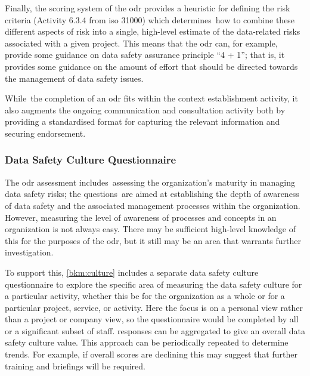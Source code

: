 Finally, the scoring system of the \gls{odr} provides a heuristic for defining the risk criteria
(Activity 6.3.4 \cbstart from \acrshort{iso} 31000\cbend)
which \cbstart determines\cbend\ how to combine these different aspects of risk into a single, high-level estimate of the data-related risks associated with a given project. This means that the \gls{odr} can, for example, provide some guidance on data safety assurance principle ``4 + 1''; that is, it provides some guidance on the amount of effort that should be directed towards the management of data safety issues.
 
\cbstart While\cbend\ the completion of an \gls{odr} fits within the context establishment activity, it also augments the ongoing communication and consultation activity both by providing a standardised format for capturing the relevant \gls{information} and securing endorsement.

\subsubsection{Data Safety Culture Questionnaire}
\cbstart The \gls{odr} assessment includes\cbend\ assessing the organization's maturity in managing data safety risks; \cbstart the questions\cbend\ are aimed at establishing the depth of awareness of data safety and the associated management processes within the organization. However, measuring the level of awareness of processes and concepts in an organization is not always easy. There may be sufficient high-level knowledge of this for the purposes of the \gls{odr}, but it still may be an area that warrants further investigation.

To support this, \cbstart\autoref{bkm:culture} includes a separate data safety culture questionnaire to explore the specific area of measuring the data safety culture for a particular activity, whether this be for the organization as a whole or for a particular project, service, or activity. Here the focus is on a personal view rather than a project or company view, so the questionnaire would be completed by all or a significant subset of staff. \Glspl{response} can be aggregated to give an overall data safety culture value. This approach can be periodically repeated to determine trends. For example, if overall scores are declining this may suggest that further training and briefings will be required.\cbend\

